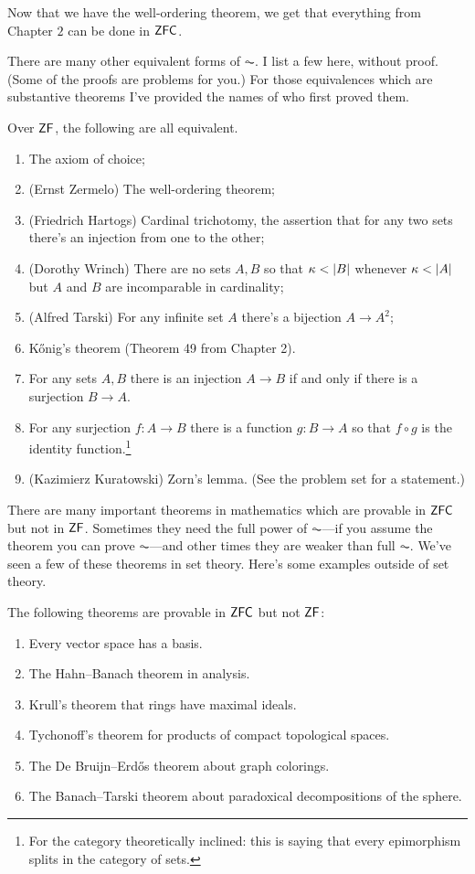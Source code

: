 \documentclass[10pt]{amsart}
\begin{document}
Now that we have the well-ordering theorem, we get that everything from Chapter $2$ can be done in $\mathsf{ZFC}$.
\smallskip

There are many other equivalent forms of $\AC$. I list a few here, without proof. (Some of the proofs are problems for you.) For those equivalences which are substantive theorems I've provided the names of who first proved them.

\begin{theorem}
Over $\mathsf{ZF}$, the following are all equivalent.
\begin{enumerate}
\item The axiom of choice;
\item (Ernst Zermelo) The well-ordering theorem;
\item (Friedrich Hartogs) Cardinal trichotomy, the assertion that for any two sets there's an injection from one to the other;
\item (Dorothy Wrinch) There are no sets $A,B$ so that $\kappa < \left\lvert B \right\rvert$ whenever $\kappa < \left\lvert A \right\rvert$ but $A$ and $B$ are incomparable in cardinality;
\item (Alfred Tarski) For any infinite set $A$ there's a bijection $A \to A^2$;
\item K\H{o}nig's theorem (Theorem 49 from Chapter 2).
\item For any sets $A,B$ there is an injection $A \to B$ if and only if there is a surjection $B \to A$.
\item For any surjection $f : A \to B$ there is a function $g : B \to A$ so that $f \circ g$ is the identity function.\footnote{For the category theoretically inclined: this is saying that every epimorphism splits in the category of sets.}
\item (Kazimierz Kuratowski) Zorn's lemma. (See the problem set for a statement.)
\end{enumerate}
\end{theorem}

There are many important theorems in mathematics which are provable in $\mathsf{ZFC}$ but not in $\mathsf{ZF}$. Sometimes they need the full power of $\AC$---if you assume the theorem you can prove $\AC$---and other times they are weaker than full $\AC$. We've seen a few of these theorems in set theory. Here's some examples outside of set theory.

\begin{example}
The following theorems are provable in $\mathsf{ZFC}$ but not $\mathsf{ZF}$:
\begin{enumerate}
\item Every vector space has a basis.
\item The Hahn--Banach theorem in analysis.
\item Krull's theorem that rings have maximal ideals.
\item Tychonoff's theorem for products of compact topological spaces.
\item The De Bruijn--Erd\H{o}s theorem about graph colorings.
\item The Banach--Tarski theorem about paradoxical decompositions of the sphere.
\end{enumerate}
\end{example}
\end{document}
